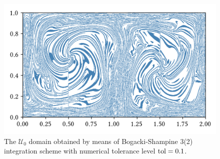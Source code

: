 \begin{figure}[htpb]
    \centering
    \includegraphics{figures/domain_figures/rkbs32_tol=0.1.png}
    \caption[The $\mathcal{U}_{0}$ domain obtained by means of
    Bogacki-Shampine 3(2) integration scheme with numerical tolerance level
    $\textnormal{tol}=0.1$]{
        The $\mathcal{U}_{0}$ domain obtained by means of Bogacki-Shampine 3(2)
    integration scheme with numerical tolerance level $\textnormal{tol}=0.1$.}
    \label{fig:u0_bs32}
\end{figure}

